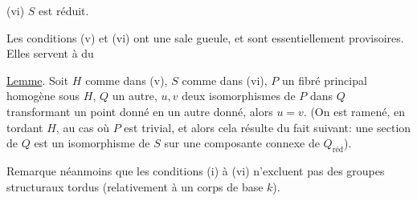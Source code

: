 
(vi) $S$ est réduit.

Les conditions (v) et (vi) ont une sale gueule, et sont essentiellement provisoires. Elles servent à   du

\uline{Lemme}. Soit $H$ comme dans (v), $S$ comme dans (vi), $P$ un fibré principal homogène sous $H$, $Q$ un autre, $u,v$ deux isomorphismes de $P$ dans $Q$ transformant un point   donné en un autre donné, alors $u=v$. (On est ramené, en tordant $H$, au cas où $P$ est trivial, et alors cela résulte du fait suivant: une section de $Q$ est un isomorphisme de $S$ sur une composante connexe de $Q_{\text{réd}}$).

Remarque néanmoins que les conditions (i) à (vi) n'excluent pas des groupes structuraux tordus (relativement à un corps de base $k$).

